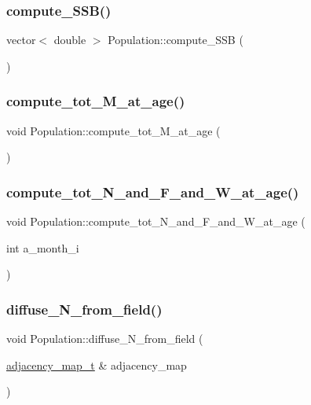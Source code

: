 \subsubsection{\texorpdfstring{compute\_SSB()}{compute\_SSB()}}
{\footnotesize\ttfamily vector$<$ double $>$ Population\+::compute\+\_\+\+S\+SB (\begin{DoxyParamCaption}{ }\end{DoxyParamCaption})}

\mbox{\label{class_population_a488c03ba52c1d02d71f4e3a164c0ae8f}} 
\subsubsection{\texorpdfstring{compute\_tot\_M\_at\_age()}{compute\_tot\_M\_at\_age()}}
{\footnotesize\ttfamily void Population\+::compute\+\_\+tot\+\_\+\+M\+\_\+at\+\_\+age (\begin{DoxyParamCaption}{ }\end{DoxyParamCaption})}

\mbox{\label{class_population_afd955edc34d65c1d75dd13fce5921b15}} 
\subsubsection{\texorpdfstring{compute\_tot\_N\_and\_F\_and\_W\_at\_age()}{compute\_tot\_N\_and\_F\_and\_W\_at\_age()}}
{\footnotesize\ttfamily void Population\+::compute\+\_\+tot\+\_\+\+N\+\_\+and\+\_\+\+F\+\_\+and\+\_\+\+W\+\_\+at\+\_\+age (\begin{DoxyParamCaption}\item[{int}]{a\+\_\+month\+\_\+i }\end{DoxyParamCaption})}

\mbox{\label{class_population_a02d833abb4f7964cbbbb284cfa9ef7bd}} 
\subsubsection{\texorpdfstring{diffuse\_N\_from\_field()}{diffuse\_N\_from\_field()}}
{\footnotesize\ttfamily void Population\+::diffuse\+\_\+\+N\+\_\+from\+\_\+field (\begin{DoxyParamCaption}\item[{\mbox{\hyperlink{myutils_8h_ae689dbcb43e66abf9a513718b83bd87d}{adjacency\+\_\+map\+\_\+t}} \&}]{adjacency\+\_\+map }\end{DoxyParamCaption})}

